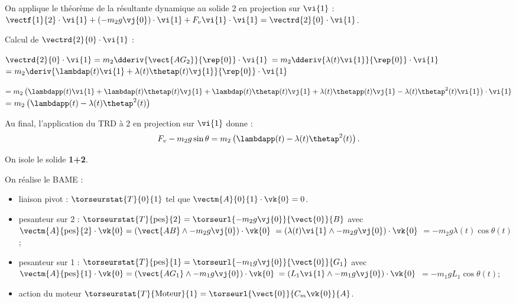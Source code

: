 On applique le théorème de la résultante dynamique au solide 2 en projection sur $\vi{1}$ :
$\vectf{1}{2}\cdot\vi{1} + \left(-m_2 g \vj{0}\right) \cdot \vi{1} + F_v \vi{1}\cdot \vi{1} = \vectrd{2}{0}\cdot \vi{1}$.

Calcul de $\vectrd{2}{0}\cdot \vi{1}$ : 

$\vectrd{2}{0}\cdot \vi{1} = m_2\dderiv{\vect{AG_2}}{\rep{0}} \cdot \vi{1}$
$= m_2 \dderiv{\lambda(t) \vi{1} }{\rep{0}} \cdot \vi{1}$
$= m_2 \deriv{\lambdap(t) \vi{1} + \lambda(t) \thetap(t)\vj{1} }{\rep{0}} \cdot \vi{1}$

$= m_2 \left(\lambdapp(t) \vi{1} + \lambdap(t) \thetap(t)\vj{1} + \lambdap(t) \thetap(t)\vj{1}
+ \lambda(t) \thetapp(t)\vj{1}- \lambda(t) \thetap^2(t)\vi{1} \right) \cdot \vi{1}$
$= m_2 \left(\lambdapp(t)   - \lambda(t) \thetap^2(t) \right)$

Au final, l'application du TRD à 2 en projection sur $\vi{1}$ donne : 
$$ F_v-m_2 g\sin \theta = m_2 \left(\lambdapp(t)   - \lambda(t) \thetap^2(t) \right).$$
\else
\fi

\ifprof
On isole le solide \textbf{1+2}.

On réalise le BAME : 
\begin{itemize}
\item liaison pivot : $\torseurstat{T}{0}{1}$ tel que $\vectm{A}{0}{1}\cdot\vk{0} = 0$.
\item pesanteur sur 2 : $\torseurstat{T}{\text{pes}}{2} = \torseurl{-m_2 g \vj{0}}{\vect{0}}{B}$ avec 
$\vectm{A}{\text{pes}}{2} \cdot \vk{0} = \left(\vect{AB}\wedge -m_2 g \vj{0} \right)\cdot \vk{0}$
$= \left(\lambda(t) \vi{1} \wedge -m_2 g \vj{0} \right)\cdot \vk{0}$
$= -m_2 g\lambda(t)\cos\theta(t) $;

\item pesanteur sur 1 : $\torseurstat{T}{\text{pes}}{1} = \torseurl{-m_1 g \vj{0}}{\vect{0}}{G_1}$ avec 
$\vectm{A}{\text{pes}}{1} \cdot \vk{0} = \left(\vect{AG_1}\wedge -m_1 g \vj{0} \right)\cdot \vk{0}$
$= \left(L_1 \vi{1}\wedge -m_1 g \vj{0} \right)\cdot \vk{0}$
$= -m_1 gL_1\cos\theta(t) $;

\item action du moteur $\torseurstat{T}{\text{Moteur}}{1} =  \torseurl{\vect{0}}{C_m \vk{0}}{A}$.
\end{itemize}

\vspace{.5cm}

